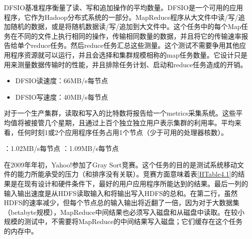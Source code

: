 DFSIO基准程序衡量了读、写和追加操作的平均数量。DFSIO是一个可用的应用程序，它作为Hadoop分布式系统的一部分。MapReduce程序从大文件中读/写/追加随机的数据，或是将随机数据读/写/追加到大文件中。这个任务中的每个Map任务在不同的文件上执行相同的操作，传输相同数量的数据，并且将它的传输速率报告给单个reduce任务。然后reduce任务汇总这些测量。这个测试不需要争用其他应用程序资源就可以运行，并且会选择和集群规模相称的map任务数量。它设计只是用来测量数据传输时的性能，并且排除任务计划、启动和reduce任务造成的开销。
\begin{itemize}
\item DFSIO读速度：66MB/s每节点
\item DFSIO写速度：40MB/s每节点
\end{itemize}
对于一个生产集群，读取和写入的比特数将报告给一个metrics采集系统。这些平均值将被接管几个星期，且通过上百个独立独立用户表示集群的利用率。平均来看，任何时刻1或2个应用程序任务占用1个节点（少于可用的处理器核数）。
\begin{itemize}
：1.02MB/s每节点
：1.09MB/s每节点
\end{itemize}


在2009年年初，Yahoo!参加了Gray Sort竞赛。这个任务的目的是测试系统移动文件的能力所能承受的压力（和排序没有关联）。竞赛方面意味着表\ref{HTable4.1}的结果是在现有设计和硬件条件下，最好的用户应用程序所能达到的结果。最后一列的输入输出速度是从HDFS读取输入和将输出写入HDFS的总和。在第二行，虽然HDFS的速率减少，但每个节点总的输入输出将近翻了一倍，因为对于大数据集（betabyte规模），MapReduce中间结果也必须写入磁盘和从磁盘中读取。在较小规模的测试中，不需要将MapReduce的中间结果写入磁盘；它们缓存在这个任务的内存中。

